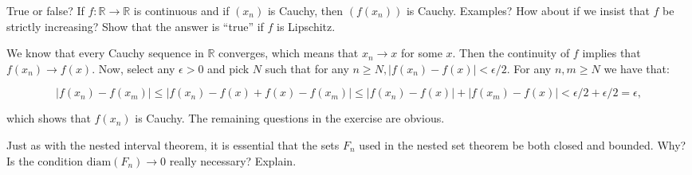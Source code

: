 \begin{exercise}{25}
    True or false?
    If $f: \mathbb{R} \rightarrow \mathbb{R}$ is continuous and if $(x_n)$ is Cauchy, then $(f(x_n))$ is Cauchy.
    Examples?
    How about if we insist that $f$ be strictly increasing?
    Show that the answer is ``true'' if $f$ is Lipschitz.
\end{exercise}

\begin{solution}
    
    We know that every Cauchy sequence in $\mathbb{R}$ converges, which means that $x_n \rightarrow x$ for some $x$.
    Then the continuity of $f$ implies that $f(x_n) \rightarrow f(x)$.
    Now, select any $\epsilon > 0$ and pick $N$ such that for any $n \geq N, \lvert f(x_n) - f(x) \rvert < \epsilon/2$.
    For any $n, m \geq N$ we have that:

    \[\lvert f(x_n) - f(x_m) \rvert \leq \lvert f(x_n) - f(x) + f(x) - f(x_m) \rvert \leq \lvert f(x_n) - f(x) \rvert + \lvert f(x_m) - f(x) \rvert < \epsilon/2 + \epsilon/2 = \epsilon,\]

    which shows that $f(x_n)$ is Cauchy.
    The remaining questions in the exercise are obvious.
\end{solution}

\begin{exercise}{26}
    Just as with the nested interval theorem, it is essential that the sets $F_n$ used in the nested set theorem be both closed and bounded.
    Why?
    Is the condition $\text{diam}(F_n) \rightarrow 0$ really necessary?
    Explain.
\end{exercise}

